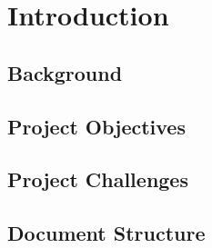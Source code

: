 \chapter{Introduction}

\section{Background}
% 

\section{Project Objectives}

\section{Project Challenges}

\section{Document Structure}
